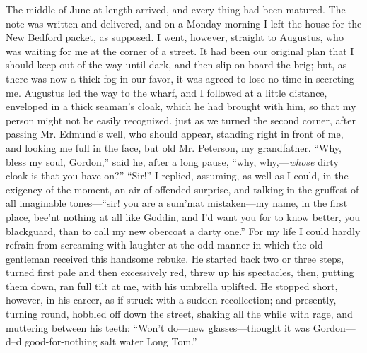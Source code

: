 The middle of June at length arrived, and every thing had been matured. The
note was written and delivered, and on a Monday morning I left the house for the
New Bedford packet, as supposed. I went, however, straight to Augustus, who was
waiting for me at the corner of a street. It had been our original plan that I
should keep out of the way until dark, and then slip on board the brig; but, as
there was now a thick fog in our favor, it was agreed to lose no time in
secreting me. Augustus led the way to the wharf, and I followed at a little
distance, enveloped in a thick seaman's cloak, which he had brought with him, so
that my person might not be easily recognized. just as we turned the second
corner, after passing Mr. Edmund's well, who should appear, standing right in
front of me, and looking me full in the face, but old Mr. Peterson, my
grandfather. ``Why, bless my soul, Gordon,'' said he, after a long pause, ``why,
why,---\emph{whose} dirty cloak is that you have on?'' ``Sir!'' I replied,
assuming, as well as I could, in the exigency of the moment, an air of offended
surprise, and talking in the gruffest of all imaginable tones---``sir! you are a
sum'mat mistaken---my name, in the first place, bee'nt nothing at all like
Goddin, and I'd want you for to know better, you blackguard, than to call my new
obercoat a darty one.'' For my life I could hardly refrain from screaming with
laughter at the odd manner in which the old gentleman received this handsome
rebuke. He started back two or three steps, turned first pale and then
excessively red, threw up his spectacles, then, putting them down, ran full tilt
at me, with his umbrella uplifted. He stopped short, however, in his career, as
if struck with a sudden recollection; and presently, turning round, hobbled off
down the street, shaking all the while with rage, and muttering between his
teeth: ``Won't do---new glasses---thought it was Gordon---d--d good-for-nothing
salt water Long Tom.'' 

